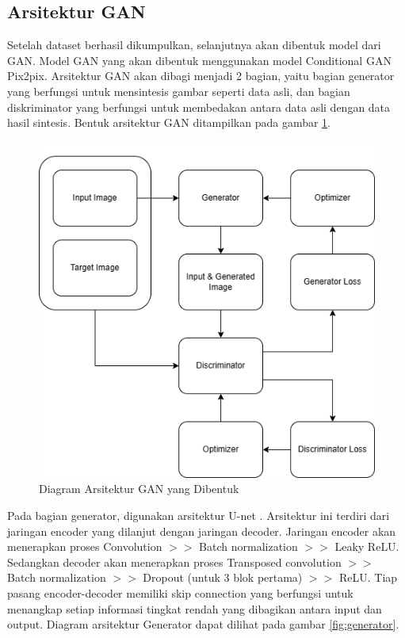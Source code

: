 \documentclass[conference]{IEEEtran}
\begin{document}
\subsection{Arsitektur GAN}
Setelah dataset berhasil dikumpulkan, selanjutnya akan dibentuk model dari GAN. 
Model GAN yang akan dibentuk menggunakan model Conditional GAN Pix2pix. 
Arsitektur GAN akan dibagi menjadi 2 bagian, yaitu bagian generator yang berfungsi untuk mensintesis gambar seperti data asli, dan bagian diskriminator yang berfungsi untuk membedakan antara data asli dengan data hasil sintesis. 
Bentuk arsitektur GAN ditampilkan pada gambar \ref{fig:arsitekturGAN}.

\begin{figure}[ht]
  \centering
  \includegraphics[scale=0.45]{gambar/Arsitektur GAN.png}
  \caption{Diagram Arsitektur GAN yang Dibentuk}
  \label{fig:arsitekturGAN}
\end{figure}

Pada bagian generator, digunakan arsitektur U-net \cite{c1}. 
Arsitektur ini terdiri dari jaringan encoder yang dilanjut dengan jaringan decoder. 
Jaringan encoder akan menerapkan proses Convolution $>>$ Batch normalization $>>$ Leaky ReLU. 
Sedangkan decoder akan menerapkan proses Transposed convolution $>>$ Batch normalization $>>$ Dropout (untuk 3 blok pertama) $>>$ ReLU. 
Tiap pasang encoder-decoder memiliki skip connection yang berfungsi untuk menangkap setiap informasi tingkat rendah yang dibagikan antara input dan output. 
Diagram arsitektur Generator dapat dilihat pada gambar \ref{fig:generator}.
\end{document}
